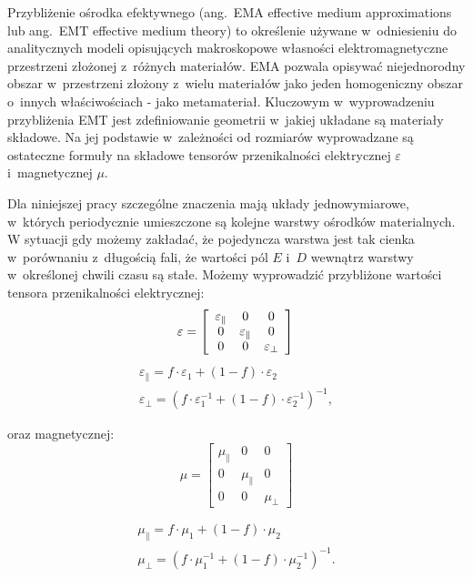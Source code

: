 \label{subart:effmedium}
Przybliżenie ośrodka efektywnego (ang.~EMA effective medium approximations lub ang.~EMT effective medium theory) to określenie używane w~odniesieniu do analitycznych modeli opisujących makroskopowe własności elektromagnetyczne przestrzeni złożonej z~różnych materiałów. EMA pozwala opisywać niejednorodny obszar w~przestrzeni złożony z~wielu materiałów jako jeden homogeniczny obszar o~innych właściwościach - jako metamateriał. Kluczowym w~wyprowadzeniu przybliżenia EMT jest zdefiniowanie geometrii w~jakiej układane są materiały składowe. Na jej podstawie w~zależności od rozmiarów wyprowadzane są ostateczne formuły na składowe tensorów przenikalności elektrycznej $\varepsilon$ i~magnetycznej $\mu$.

Dla niniejszej pracy szczególne znaczenia mają układy jednowymiarowe, w~których periodycznie umieszczone są kolejne warstwy ośrodków materialnych. W sytuacji gdy możemy zakładać, że pojedyncza warstwa jest tak cienka w~porównaniu z~długością fali, że wartości pól $E$ i~$D$ wewnątrz warstwy w~określonej chwili czasu są stałe. Możemy wyprowadzić przybliżone wartości tensora przenikalności elektrycznej:
\[ \varepsilon= \left[ \begin{array}{ccc}
	\varepsilon_{\parallel} & 0 & 0 \\
	0 & \varepsilon_{\parallel} & 0 \\
	0 & 0 &  \varepsilon_{\perp} \end{array} \right] 
\\
\]
\begin{equation}
	\begin{gathered}
		\varepsilon_{\parallel}=f\cdot{\varepsilon_1}+(1-f)\cdot \varepsilon_2 \\ 
		\varepsilon_{\perp}=\left(f\cdot{\varepsilon_1^{-1}}+(1-f)\cdot \varepsilon_2^{-1}\right)^{-1},
	\end{gathered}
\label{eq:effmedium}
\end{equation}


oraz magnetycznej:
\[ \mu= \left[ \begin{array}{ccc}
					\mu_{\parallel} & 0 & 0 \\
					0 & \mu_{\parallel} & 0 \\
					0 & 0 &  \mu_{\perp} \end{array} \right]
\]

\begin{equation}
	\begin{gathered}
		\mu_{\parallel}=f\cdot{\mu_1}+(1-f)\cdot \mu_2 \\
		\mu_{\perp}=\left(f\cdot{\mu_1^{-1}}+(1-f)\cdot \mu_2^{-1}\right)^{-1}.
	\end{gathered}
\label{eq:effmedium-mu}
\end{equation}

